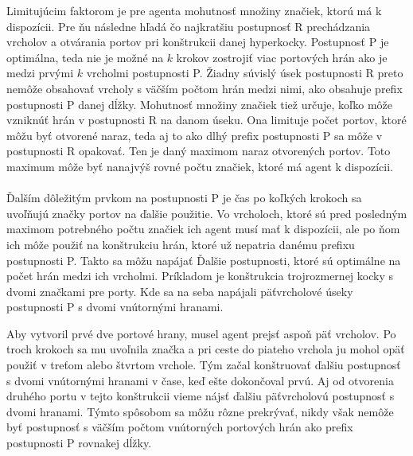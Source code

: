 Limitujúcim faktorom je pre agenta mohutnosť množiny značiek, ktorú má k
dispozícii. Pre ňu následne hľadá čo najkratšiu postupnosť R prechádzania
vrcholov a otvárania portov pri konštrukcii danej hyperkocky. Postupnosť P
je optimálna, teda nie je možné na $k$ krokov zostrojiť viac
portových hrán ako je medzi prvými $k$ vrcholmi postupnosti P. Žiadny
súvislý úsek postupnosti R preto nemôže obsahovať vrcholy s väčším počtom
hrán medzi nimi, ako obsahuje prefix postupnosti P danej dĺžky.
Mohutnosť množiny značiek tiež určuje, koľko môže vzniknúť hrán v
postupnosti R na danom úseku. Ona limituje počet portov, ktoré môžu byť 
otvorené
naraz, teda aj to ako dlhý prefix postupnosti P sa môže v postupnosti R
opakovať. Ten je daný maximom naraz otvorených portov. Toto maximum môže byť
nanajvýš rovné počtu značiek, ktoré má agent k dispozícii.
\\ \\
Ďalším dôležitým prvkom na postupnosti P je čas po koľkých krokoch sa
uvoľňujú značky portov na ďalšie použitie. Vo vrcholoch, ktoré sú pred
posledným maximom potrebného počtu značiek ich agent musí mať k dispozícii,
ale po ňom ich môže použiť na konštrukciu hrán, ktoré už nepatria danému
prefixu postupnosti P. Takto sa môžu napájať Ďalšie postupnosti, ktoré sú
optimálne na počet hrán medzi ich vrcholmi. Príkladom je konštrukcia
trojrozmernej kocky s dvomi značkami pre porty. Kde sa na seba napájali
päťvrcholové úseky postupnosti P s dvomi vnútornými hranami. 

Aby vytvoril prvé dve portové hrany, musel agent prejsť aspoň päť vrcholov.
Po troch krokoch sa mu uvoľnila značka a pri ceste do piateho vrchola ju
mohol opäť použiť v treťom alebo štvrtom vrchole. Tým začal konštruovať
ďalšiu postupnosť s dvomi vnútornými hranami v čase, keď ešte dokončoval
prvú. Aj od otvorenia druhého portu v tejto konštrukcii vieme nájsť ďalšiu
päťvrcholovú postupnosť s dvomi hranami. Týmto spôsobom sa môžu rôzne
prekrývať, nikdy však nemôže byť postupnosť s väčším počtom vnútorných
portových hrán ako prefix postupnosti P rovnakej dĺžky.
